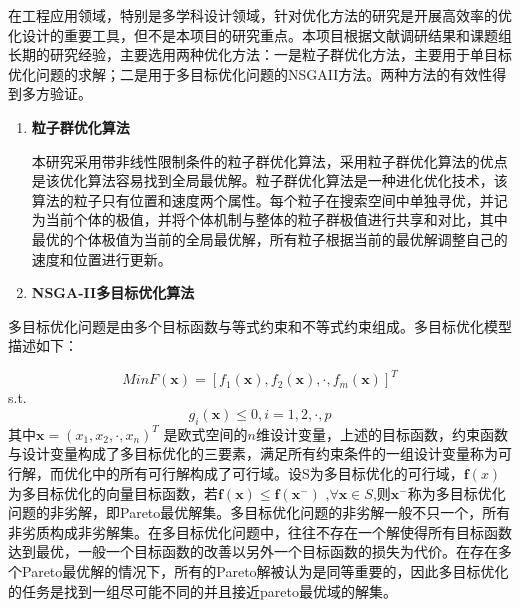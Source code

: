 \documentclass[12pt,a4paper]{report}
\begin{document}
在工程应用领域，特别是多学科设计领域，针对优化方法的研究是开展高效率的优化设计的重要工具，但不是本项目的研究重点。本项目根据文献调研结果和课题组长期的研究经验，主要选用两种优化方法：一是粒子群优化方法，主要用于单目标优化问题的求解；二是用于多目标优化问题的NSGAII方法。两种方法的有效性得到多方验证。
\begin{enumerate}
\item \textbf{粒子群优化算法}

本研究采用带非线性限制条件的粒子群优化算法，采用粒子群优化算法的优点是该优化算法容易找到全局最优解\cite{wang2018particle}。粒子群优化算法是一种进化优化技术，该算法的粒子只有位置和速度两个属性。每个粒子在搜索空间中单独寻优，并记为当前个体的极值，并将个体机制与整体的粒子群极值进行共享和对比，其中最优的个体极值为当前的全局最优解，所有粒子根据当前的最优解调整自己的速度和位置进行更新。

\item \textbf{NSGA-II多目标优化算法}
\end{enumerate}

多目标优化问题是由多个目标函数与等式约束和不等式约束组成。多目标优化模型描述如下：

\begin{equation}
Min F(\textbf{x})=[f_1(\textbf{x}), f_2(\textbf{x}),\cdot, f_m(\textbf{x})]^T
\end{equation}
s.t.
\begin{equation}
g_i(\textbf{x})\le0, i=1,2,\cdot, p
\end{equation}
其中$\textbf{x}={(x_1,x_2,\cdot, x_n)}^T$ 是欧式空间的$n$维设计变量，上述的目标函数，约束函数与设计变量构成了多目标优化的三要素，满足所有约束条件的一组设计变量称为可行解，而优化中的所有可行解构成了可行域。设S为多目标优化的可行域，$\textbf{f}(x)$为多目标优化的向量目标函数，若$\textbf{f}(\textbf{x})\le\textbf{f}(\textbf{x}^-)$ ,$\forall \textbf{x}\in S$,则$\textbf{x}^- $称为多目标优化问题的非劣解，即Pareto最优解集。多目标优化问题的非劣解一般不只一个，所有非劣质构成非劣解集。在多目标优化问题中，往往不存在一个解使得所有目标函数达到最优，一般一个目标函数的改善以另外一个目标函数的损失为代价。在存在多个Pareto最优解的情况下，所有的Pareto解被认为是同等重要的，因此多目标优化的任务是找到一组尽可能不同的并且接近pareto最优域的解集。
\end{document}
